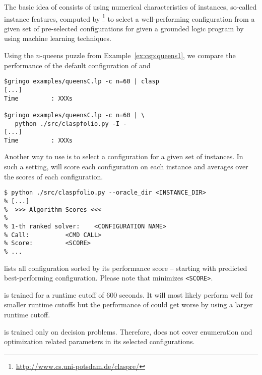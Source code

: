 The basic idea of \claspfolio{} consists of using numerical characteristics of instances, so-called instance features, computed by \claspre{}\footnote{\url{http://www.cs.uni-potsdam.de/claspre/}}
to select a well-performing configuration from a given set of pre-selected configurations
for given a grounded logic program by using machine learning techniques.
\begin{example}\label{subsec:example:claspfolio}
Using the $n$-queens puzzle from Example~\ref{ex:csp:queens1}, 
we compare the performance of the default configuration of \clasp{} 
and \claspfolio{}
\begin{lstlisting}[numbers=none]
$gringo examples/queensC.lp -c n=60 | clasp
[...]
Time         : XXXs

$gringo examples/queensC.lp -c n=60 | \
   python ./src/claspfolio.py -I -
[...]
Time         : XXXs
\end{lstlisting}

\end{example}

\begin{example}\label{subsec:example:claspfolio_oralce}
Another way to use \claspfolio{} is to select a configuration for a given set of instances.
In such a setting, \claspfolio{} will score each configuration on each instance 
and averages over the scores of each configuration.
\begin{lstlisting}[numbers=none]
$ python ./src/claspfolio.py --oracle_dir <INSTANCE_DIR>
% [...]
%  >>> Algorithm Scores <<<
% 
% 1-th ranked solver: 	 <CONFIGURATION NAME>
% Call: 		 <CMD CALL>
% Score: 		 <SCORE>
% ...
\end{lstlisting}

\claspfolio{} lists all configuration sorted by its performance score -- starting with predicted best-performing configuration.
Please note that \claspfolio{} minimizes \texttt{<SCORE>}.
\end{example}

\begin{note}
\claspfolio{} is trained for a runtime cutoff of $600$ seconds. 
It will most likely perform well for smaller runtime cutoffs 
but the performance of \claspfolio{} could get worse by using a larger runtime cutoff.
\end{note}

\begin{note}
\claspfolio{} is trained only on decision problems.
Therefore, \claspfolio{} does not cover enumeration and optimization related parameters in its selected configurations.
\end{note}

